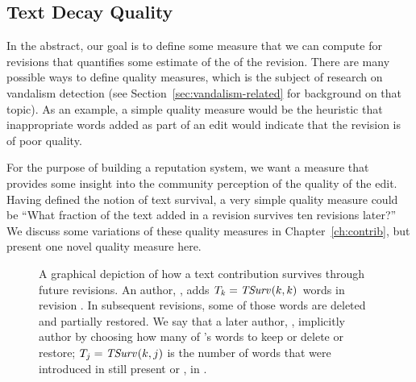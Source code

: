 \subsection{Text Decay Quality}

In the abstract, our goal is to define some measure that we can compute for
revisions that quantifies some estimate of the  of the
revision.
There are many possible ways to define quality measures, which is the
subject of research on vandalism detection (see
Section~\ref{sec:vandalism-related} for background on that topic).
As an example, a simple quality measure would be the heuristic that
inappropriate words added as part of an edit would indicate that the revision
is of poor quality.

For the purpose of building a reputation system, we want a measure
that provides some insight into the community perception of the
quality of the edit.
Having defined the notion of text survival, a very simple quality measure
could be ``What fraction of the text added in a revision survives
ten revisions later?''
We discuss some variations of these quality measures in
Chapter~\ref{ch:contrib}, but present one novel quality measure here.

\begin{figure}[htbp]
\centering
{}
\caption{A graphical depiction of how a text contribution survives
	through future revisions.
        An author, , adds
    $T_k = \mathit{TSurv}_{}(k,k)$ words in revision .  In subsequent
    revisions, some of those words are deleted and partially restored.
    We say that a later author, , implicitly 
    author  by choosing how many of 's words
    to keep or delete or restore; $T_j = \mathit{TSurv}_{}(k,j)$ is the number of words
    that were introduced in  still present or
    , in .
}
\label{fig:textsurvival} 
\end{figure}


